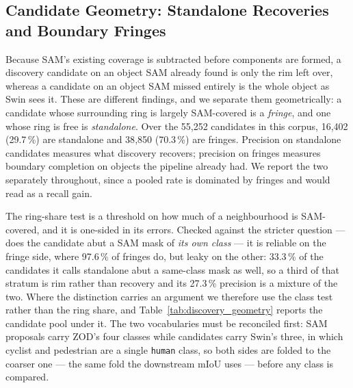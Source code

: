 \documentclass[conference]{IEEEtran}
\begin{document}
\subsection{Candidate Geometry: Standalone Recoveries and Boundary Fringes}
Because SAM's existing coverage is subtracted before components are formed, a discovery candidate on an
object SAM already found is only the rim left over, whereas a candidate on an object SAM missed entirely
is the whole object as Swin sees it. These are different findings, and we separate them geometrically:
a candidate whose surrounding ring is largely SAM-covered is a \emph{fringe}, and one whose ring is free
is \emph{standalone}. Over the 55{,}252 candidates in this corpus, 16{,}402 (29.7\,\%) are standalone and
38{,}850 (70.3\,\%) are fringes. Precision on standalone candidates measures what discovery recovers;
precision on fringes measures boundary completion on objects the pipeline already had. We report the two
separately throughout, since a pooled rate is dominated by fringes and would read as a recall gain.

The ring-share test is a threshold on how much of a neighbourhood is SAM-covered, and it is one-sided in
its errors. Checked against the stricter question --- does the candidate abut a SAM mask of \emph{its
own class} --- it is reliable on the fringe side, where 97.6\,\% of fringes do, but leaky on the other:
33.3\,\% of the candidates it calls standalone abut a same-class mask as well, so a third of that
stratum is rim rather than recovery and its 27.3\,\% precision is a mixture of the two.
Where the distinction carries an argument we therefore use the class test rather than the ring share,
and Table~\ref{tab:discovery_geometry} reports the candidate pool under it.
The two vocabularies must be reconciled first: SAM proposals carry ZOD's four classes while candidates
carry Swin's three, in which cyclist and pedestrian are a single \texttt{human} class, so both sides are
folded to the coarser one --- the same fold the downstream mIoU uses --- before any class is compared.
\end{document}
